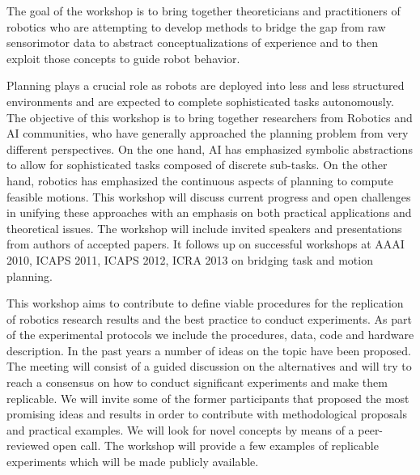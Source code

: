 \begin{spacing}{1.0}
{The goal of the workshop is to bring together theoreticians and practitioners of robotics who are attempting to develop methods to bridge the gap from raw sensorimotor data to abstract conceptualizations of experience and to then exploit those concepts to guide robot behavior. 
}




{
Planning plays a crucial role as robots are deployed into less and less structured environments and are expected to complete sophisticated tasks autonomously. The objective of this workshop is to bring together researchers from Robotics and AI communities, who have generally approached the planning problem from very different perspectives. On the one hand, AI has emphasized symbolic abstractions to allow for sophisticated tasks composed of discrete sub-tasks. On the other hand, robotics has emphasized the continuous aspects of planning to compute feasible motions. This workshop will discuss current progress and open challenges in unifying these approaches with an emphasis on both practical applications and theoretical issues. The workshop will include invited speakers and presentations from authors of accepted papers. It follows up on successful workshops at AAAI 2010, ICAPS 2011, ICAPS 2012, ICRA 2013 on bridging task and motion planning.
}



{
This workshop aims to contribute to define viable procedures for the replication of robotics research results and the best practice to conduct experiments. As part of the experimental protocols we include the procedures, data, code and hardware description. In the past years a number of ideas on the topic have been proposed. The meeting will consist of a guided discussion on the alternatives and will try to reach a consensus on how to conduct significant experiments and make them replicable. We will invite some of the former participants that proposed the most promising ideas and results in order to contribute with methodological proposals and practical examples. We will look for novel concepts by means of a peer-reviewed open call. The workshop will provide a few examples of replicable experiments which will be made publicly available.

}
\end{spacing}
